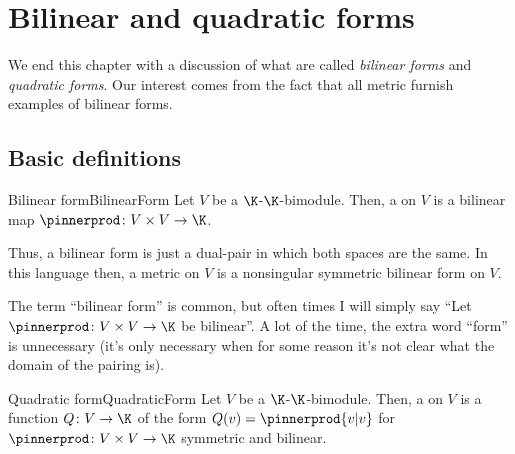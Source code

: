 \section{Bilinear and quadratic forms}

We end this chapter with a discussion of what are called \emph{bilinear forms} and \emph{quadratic forms}.  Our interest comes from the fact that all metric furnish examples of bilinear forms.

\subsection{Basic definitions}

\begin{dfn}{Bilinear form}{BilinearForm}
	Let $V$ be a $\K$-$\K$-bimodule.  Then, a  on $V$ is a bilinear map $\pinnerprod \colon V\times V\rightarrow \K$.
	\begin{rmk}
		Thus, a bilinear form is just a dual-pair in which both spaces are the same.  In this language then, a metric on $V$ is a nonsingular symmetric bilinear form on $V$.
		
		The term ``bilinear form'' is common, but often times I will simply say ``Let $\pinnerprod \colon V\times V\rightarrow \K$ be bilinear\textellipsis ''.  A lot of the time, the extra word ``form'' is unnecessary (it's only necessary when for some reason it's not clear what the domain of the pairing is).
	\end{rmk}
\end{dfn}
\begin{dfn}{Quadratic form}{QuadraticForm}
	Let $V$ be a $\K$-$\K$-bimodule.  Then, a  on $V$ is a function $Q\colon V\rightarrow \K$ of the form $Q(v)=\pinnerprod{v|v}$ for $\pinnerprod \colon V\times V\rightarrow \K$ symmetric and bilinear.
\end{dfn}
